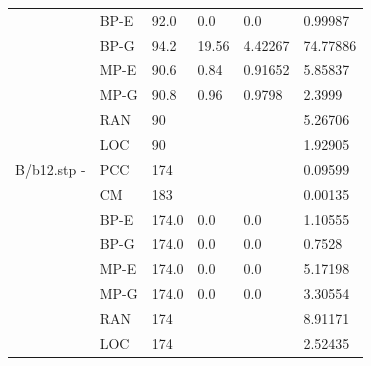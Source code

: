 \documentclass[12pt,a4paper]{article}
\begin{document}
\begin{center}
\begin{tabular}{l|l|l|l|l|l}
		&BP-E&92.0&0.0&0.0&0.99987\\
		&BP-G&94.2&19.56&4.42267&74.77886\\
		&MP-E&90.6&0.84&0.91652&5.85837\\&MP-G&90.8&0.96&0.9798&2.3999\\
		&RAN&90&&&5.26706\\
		&LOC&90&&&1.92905\\\hline
		B/b12.stp - &PCC&174&&&0.09599\\
		&CM&183&&&0.00135\\
		&BP-E&174.0&0.0&0.0&1.10555\\
		&BP-G&174.0&0.0&0.0&0.7528\\
		&MP-E&174.0&0.0&0.0&5.17198\\&MP-G&174.0&0.0&0.0&3.30554\\
		&RAN&174&&&8.91171\\
		&LOC&174&&&2.52435\\\hline
	\end{tabular}
\end{center}
\end{document}
